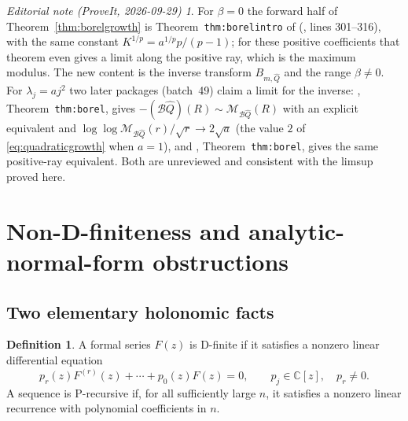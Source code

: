 \documentclass[11pt,a4paper]{article}
\numberwithin{equation}{section}
\theoremstyle{definition}
\newtheorem{definition}[theorem]{Definition}
\theoremstyle{remark}
\newtheorem*{ednote}{Editorial note (ProveIt, 2026-09-29)}
\newcommand{\C}{\mathbb C}
\newcommand{\B}{\mathcal B}
\newcommand{\Q}{\widehat Q}
\begin{document}
\begin{ednote}
For $\beta=0$ the forward half of Theorem~\ref{thm:borelgrowth} is
Theorem~\texttt{thm:borelintro} of \cite{feedback}
(,
lines 301--316), with the same constant $K^{1/p}=a^{1/p}p/(p-1)$; for
these positive coefficients that theorem even gives a limit along the
positive ray, which is the maximum modulus. The new content is the inverse
transform $B_{m,\Q}$ and the range $\beta\ne0$. For $\lambda_j=aj^2$ two
later packages (batch~49) claim a limit for the inverse:
\cite{ed:sqf}, Theorem~\texttt{thm:borel}, gives
$-(\B\Q)(R)\sim\mathcal M_{\B\Q}(R)$ with an explicit equivalent and
$\log\log\mathcal M_{\B\Q}(r)/\sqrt r\to2\sqrt a$ (the value $2$ of
\eqref{eq:quadraticgrowth} when $a=1$), and \cite{ed:qef},
Theorem~\texttt{thm:borel}, gives the same positive-ray equivalent. Both
are unreviewed and consistent with the limsup proved here.
\end{ednote}

\section{Non-D-finiteness and analytic-normal-form obstructions}
\label{sec:holonomic}

\subsection{Two elementary holonomic facts}

\begin{definition}
A formal series $F(z)$ is D-finite if it satisfies a nonzero linear
differential equation
\begin{equation}
 p_r(z)F^{(r)}(z)+\cdots+p_0(z)F(z)=0,
 \qquad p_j\in\C[z],\quad p_r\ne0.
 \label{eq:Dfinite}
\end{equation}
A sequence is P-recursive if, for all sufficiently large $n$, it
satisfies a nonzero linear recurrence with polynomial coefficients in $n$.
\end{definition}
\end{document}
